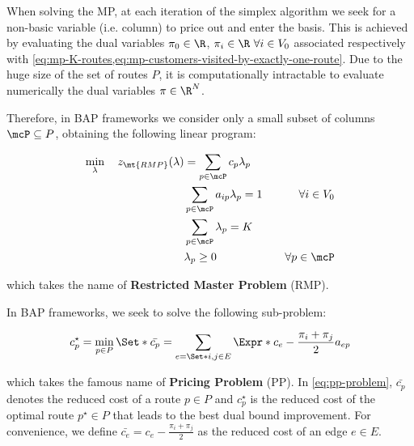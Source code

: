When solving the MP,
at each iteration of the simplex algorithm \parencite{dantzig1955} we seek for a non-basic variable (i.e. column)
to price out and enter the basis.
This is achieved by evaluating the dual variables $\pi_0 \in \R$, $\pi_{i} \in \R \ \forall i \in V_0$
associated respectively with \cref{eq:mp-K-routes,eq:mp-customers-visited-by-exactly-one-route}.
Due to the huge size of the set of routes $P$,
it is computationally intractable to evaluate numerically the dual variables $\pi \in \R^{N}$.

\medskip

Therefore, in BAP frameworks we consider only a small subset of columns $\mcP \subseteq P$,
obtaining the following linear program:

\begin{align}
	\min_{\lambda} \quad z_\mt{RMP}(\lambda) & = \sum_{p \in \mcP}  c_p \lambda_p \label{eq:rmp-obj-func}                                                                                                                              \\
	                                         & \sum_{p \in \mcP}  a_{ip} \lambda_p = 1                    & \quad \forall i \in V_0                                              \label{eq:rmp-customers-visited-by-exactly-one-route} \\
	                                         & \sum_{p \in \mcP} \lambda_{p} = K\label{eq:rmp-K-routes}                                                                                                                                \\
	                                         & \lambda_p \ge 0                                      & \quad \forall p \in \mcP \label{eq:rmp-lambda-mip-var-bounds}
\end{align}

which takes the name of \textbf{Restricted Master Problem} (RMP).

In BAP frameworks, we seek to solve the following sub-problem:

\begin{equation}\label{eq:pp-problem}
	{c^\star_p} = \min_{p \in P} \Set*{ \bar{c_p} = \sum_{e = \Set*{i, j} \in E} \Expr*{c_{e} - \frac{\pi_i + \pi_j}{2}} a_{ep}  }
\end{equation}

which takes the famous name of \textbf{Pricing Problem} (PP).
In \cref{eq:pp-problem}, $\bar{c_p}$ denotes the reduced cost of a route $p \in P$
and $c^\star_p$ is the reduced cost of the optimal route $p^\star \in P$
that leads to the best dual bound improvement.
For convenience,
we define $\bar{c_{e}} = c_{e} - \frac{\pi_i + \pi_j}{2}$
as the reduced cost of an edge $e\in E$.

